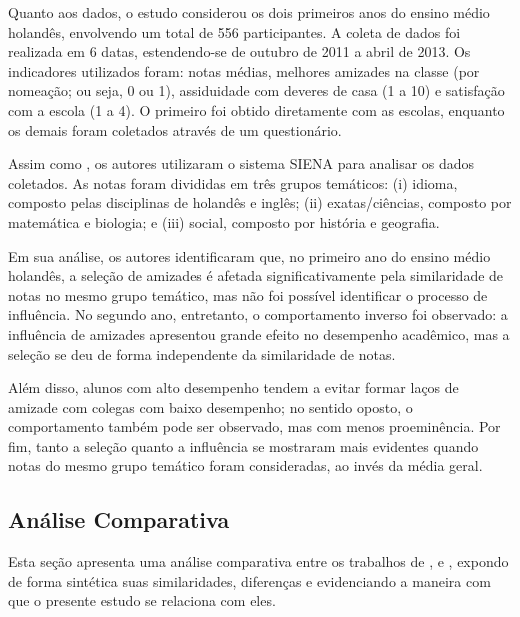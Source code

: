 Quanto aos dados, o estudo considerou os dois primeiros anos do ensino médio holandês, envolvendo um total de 556 participantes. A coleta de dados foi realizada em 6 datas, estendendo-se de outubro de 2011 a abril de 2013. Os indicadores utilizados foram: notas médias, melhores amizades na classe (por nomeação; ou seja, 0 ou 1), assiduidade com deveres de casa (1 a 10) e satisfação com a escola (1 a 4). O primeiro foi obtido diretamente com as escolas, enquanto os demais foram coletados através de um questionário.

Assim como , os autores utilizaram o sistema SIENA para analisar os dados coletados. As notas foram divididas em três grupos temáticos: (i) idioma, composto pelas disciplinas de holandês e inglês; (ii) exatas/ciências, composto por matemática e biologia; e (iii) social, composto por história e geografia.

Em sua análise, os autores identificaram que, no primeiro ano do ensino médio holandês, a seleção de amizades é afetada significativamente pela similaridade de notas no mesmo grupo temático, mas não foi possível identificar o processo de influência. No segundo ano, entretanto, o comportamento inverso foi observado: a influência de amizades apresentou grande efeito no desempenho acadêmico, mas a seleção se deu de forma independente da similaridade de notas.

Além disso, alunos com alto desempenho tendem a evitar formar laços de amizade com colegas com baixo desempenho; no sentido oposto, o comportamento também pode ser observado, mas com menos proeminência. Por fim, tanto a seleção quanto a influência se mostraram mais evidentes quando notas do mesmo grupo temático foram consideradas, ao invés da média geral.

\subsection{Análise Comparativa} \label{sec:relatedcomparison}

Esta seção apresenta uma análise comparativa entre os trabalhos de ,  e , expondo de forma sintética suas similaridades, diferenças e evidenciando a maneira com que o presente estudo se relaciona com eles.

